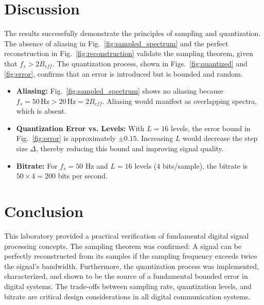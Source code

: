 \documentclass[conference]{IEEEtran}
\begin{document}
\section{Discussion}
The results successfully demonstrate the principles of sampling and quantization. The absence of aliasing in Fig.~\ref{fig:sampled_spectrum} and the perfect reconstruction in Fig.~\ref{fig:reconstruction} validate the sampling theorem, given that $f_s > 2B_{eff}$. The quantization process, shown in Figs.~\ref{fig:quantized} and \ref{fig:error}, confirms that an error is introduced but is bounded and random.
\begin{itemize}
    \item \textbf{Aliasing:} Fig.~\ref{fig:sampled_spectrum} shows no aliasing because $f_s=50\,\text{Hz} > 20\,\text{Hz}=2B_{eff}$. Aliasing would manifest as overlapping spectra, which is absent.
    \item \textbf{Quantization Error vs. Levels:} With $L=16$ levels, the error bound in Fig.~\ref{fig:error} is approximately $\pm0.15$. Increasing $L$ would decrease the step size $\Delta$, thereby reducing this bound and improving signal quality.
    \item \textbf{Bitrate:} For $f_s=50$ Hz and $L=16$ levels ($4$ bits/sample), the bitrate is $50 \times 4 = 200$ bits per second.
\end{itemize}

\section{Conclusion}
This laboratory provided a practical verification of fundamental digital signal processing concepts. The sampling theorem was confirmed: A signal can be perfectly reconstructed from its samples if the sampling frequency exceeds twice the signal's bandwidth. Furthermore, the quantization process was implemented, characterized, and shown to be the source of a fundamental bounded error in digital systems. The trade-offs between sampling rate, quantization levels, and bitrate are critical design considerations in all digital communication systems.

\printbibliography
\end{document}
